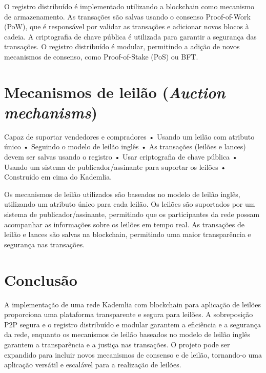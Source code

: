 \documentclass[conference]{IEEEtran}
\begin{document}
    O registro distribuído é implementado utilizando a blockchain como mecanismo de armazenamento. As transações são salvas usando o consenso Proof-of-Work (PoW), que é responsável por validar as transações e adicionar novos blocos à cadeia. A criptografia de chave pública é utilizada para garantir a segurança das transações. O registro distribuído é modular, permitindo a adição de novos mecanismos de consenso, como Proof-of-Stake (PoS) ou BFT.\\


    \section{Mecanismos de leilão (\textit{Auction mechanisms})}

    Capaz de suportar vendedores e compradores
    • Usando um leilão com atributo único
    • Seguindo o modelo de leilão inglês
    • As transações (leilões e lances) devem ser salvas usando o registro
    • Usar criptografia de chave pública
    • Usando um sistema de publicador/assinante para suportar os leilões
    • Construído em cima do Kademlia.

    Os mecanismos de leilão utilizados são baseados no modelo de leilão inglês, utilizando um atributo único para cada leilão. Os leilões são suportados por um sistema de publicador/assinante, permitindo que os participantes da rede possam acompanhar as informações sobre os leilões em tempo real. As transações de leilão e lances são salvas na blockchain, permitindo uma maior transparência e segurança nas transações.\\


    \section{Conclusão}
    A implementação de uma rede Kademlia com blockchain para aplicação de leilões proporciona uma plataforma transparente e segura para leilões. A sobreposição P2P segura e o registro distribuído e modular garantem a eficiência e a segurança da rede, enquanto os mecanismos de leilão baseados no modelo de leilão inglês garantem a transparência e a justiça nas transações. O projeto pode ser expandido para incluir novos mecanismos de consenso e de leilão, tornando-o uma aplicação versátil e escalável para a realização de leilões.\\








    \begin{thebibliography}{1}
        \bibitem{}
    \end{thebibliography}
\end{document}

